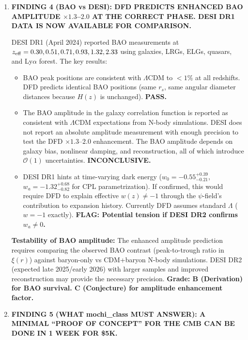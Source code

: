 \documentclass[11pt]{article}
\newcommand{\LCDM}{$\Lambda$CDM}
\begin{document}
\begin{tcolorbox}[colback=blue!5!white, colframe=blue!70!black,
  title=\textbf{W4i22 TOP 5 FINDINGS --- COSMOLOGY TEAM}]
\begin{enumerate}
\item \textbf{FINDING 4 (BAO vs DESI): DFD PREDICTS ENHANCED BAO AMPLITUDE
  $\times 1.3$--$2.0$ AT THE CORRECT PHASE. DESI DR1 DATA IS NOW AVAILABLE
  FOR COMPARISON.}

  DESI DR1 (April 2024) reported BAO measurements at $z_{\rm eff} = 0.30,
  0.51, 0.71, 0.93, 1.32, 2.33$ using galaxies, LRGs, ELGs, quasars, and
  Ly$\alpha$ forest.  The key results:

  \begin{itemize}
  \item BAO peak positions are consistent with \LCDM{} to $<1\%$ at all
    redshifts.  DFD predicts identical BAO positions (same $r_s$, same
    angular diameter distances because $H(z)$ is unchanged).
    \textbf{PASS.}

  \item The BAO amplitude in the galaxy correlation function is
    reported as consistent with \LCDM{} expectations from N-body
    simulations. DESI does not report an absolute amplitude measurement
    with enough precision to test the DFD $\times 1.3$--$2.0$ enhancement.
    The BAO amplitude depends on galaxy bias, nonlinear damping, and
    reconstruction, all of which introduce $\mathcal{O}(1)$ uncertainties.
    \textbf{INCONCLUSIVE.}

  \item DESI DR1 hints at time-varying dark energy ($w_0 = -0.55^{+0.39}_{-0.21}$,
    $w_a = -1.32^{+0.68}_{-0.82}$ for CPL parametrization).  If confirmed,
    this would require DFD to explain effective $w(z) \neq -1$ through the
    $\psi$-field's contribution to expansion history.  Currently DFD
    assumes standard $\Lambda$ ($w = -1$ exactly).
    \textbf{FLAG: Potential tension if DESI DR2 confirms $w_a \neq 0$.}
  \end{itemize}

  \textbf{Testability of BAO amplitude:}  The enhanced amplitude prediction
  requires comparing the observed BAO contrast (peak-to-trough ratio in
  $\xi(r)$) against baryon-only vs CDM+baryon N-body simulations.  DESI DR2
  (expected late 2025/early 2026) with larger samples and improved
  reconstruction may provide the necessary precision.
  \textbf{Grade: B (Derivation) for BAO survival.  C (Conjecture) for
  amplitude enhancement factor.}

\item \textbf{FINDING 5 (WHAT mochi\_class MUST ANSWER): A MINIMAL
  ``PROOF OF CONCEPT'' FOR THE CMB CAN BE DONE IN 1 WEEK FOR \$5K.}


\end{enumerate}
\end{tcolorbox}
\end{document}
